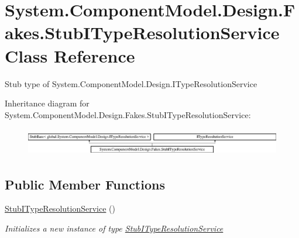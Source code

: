 \hypertarget{class_system_1_1_component_model_1_1_design_1_1_fakes_1_1_stub_i_type_resolution_service}{\section{System.\-Component\-Model.\-Design.\-Fakes.\-Stub\-I\-Type\-Resolution\-Service Class Reference}
\label{class_system_1_1_component_model_1_1_design_1_1_fakes_1_1_stub_i_type_resolution_service}
}


Stub type of System.\-Component\-Model.\-Design.\-I\-Type\-Resolution\-Service 


Inheritance diagram for System.\-Component\-Model.\-Design.\-Fakes.\-Stub\-I\-Type\-Resolution\-Service\-:\begin{figure}[H]
\begin{center}
\leavevmode
\includegraphics[height=1.225383cm]{class_system_1_1_component_model_1_1_design_1_1_fakes_1_1_stub_i_type_resolution_service}
\end{center}
\end{figure}
\subsection*{Public Member Functions}
\begin{DoxyCompactItemize}
\item 
\hyperlink{class_system_1_1_component_model_1_1_design_1_1_fakes_1_1_stub_i_type_resolution_service_a4d18a442819ac13808e3f95c9f3280e4}{Stub\-I\-Type\-Resolution\-Service} ()
\begin{DoxyCompactList}\small\item\em Initializes a new instance of type \hyperlink{class_system_1_1_component_model_1_1_design_1_1_fakes_1_1_stub_i_type_resolution_service}{Stub\-I\-Type\-Resolution\-Service}\end{DoxyCompactList}\end{DoxyCompactItemize}
